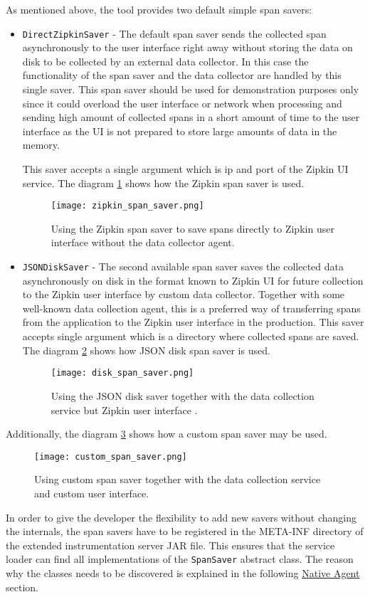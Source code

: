 As mentioned above, the tool provides two default simple span savers:
\begin{itemize}
	\item  \texttt{DirectZipkinSaver} - The default span saver sends the collected span  asynchronously to the user interface right away without storing the data on disk to be collected by an external data collector. In this case the functionality of the span saver and the data collector are handled by this single saver. This span saver should be used for demonstration purposes only since it could overload the user interface or network when processing and sending high amount of collected spans in a short amount of time to the user interface as the UI is not prepared to store large amounts of data in the memory. 
	
	This saver accepts a single argument which is ip and port of the Zipkin UI service. The diagram \ref{fig:zipkin_span_saver} shows how the Zipkin span saver is used.
	
		\begin{figure}
			\centering
			\texttt{[image: zipkin\_span\_saver.png]}
			\caption{Using the Zipkin span saver to save spans directly to Zipkin user interface without the data collector agent.}
			\label{fig:zipkin_span_saver}
		\end{figure}
	\item  \texttt{JSONDiskSaver} - The second available span saver saves the collected data asynchronously on disk in the format known to Zipkin UI for future collection to the Zipkin user interface by custom data collector. Together with some well-known data collection agent, this is a preferred way of transferring spans from the application to the Zipkin user interface in the production. This saver accepts single argument which is a directory where collected spans are saved. The diagram \ref{fig:disk_span_saver} shows how JSON disk span saver is used.
	\begin{figure}
		\centering
		\texttt{[image: disk\_span\_saver.png]}
		\caption{Using the JSON disk saver together with the data collection service but Zipkin user interface .}
		\label{fig:disk_span_saver}
	\end{figure}
\end{itemize}
Additionally, the diagram \ref{fig:custom_span_saver} shows how a custom span saver may be used.

\begin{figure}
	\centering
	\texttt{[image: custom\_span\_saver.png]}
	\caption{Using custom span saver together with the data collection service and custom user interface.}
	\label{fig:custom_span_saver}
\end{figure}
In order to give the developer the flexibility to add new savers without changing the internals, the span savers have to be  registered in the META-INF directory of the extended instrumentation server JAR file. This ensures that the service loader can find all implementations of the \texttt{SpanSaver} abstract class. The reason why the classes needs to be discovered is explained in the following \hyperref[native_agent_design]{Native Agent} section. 

